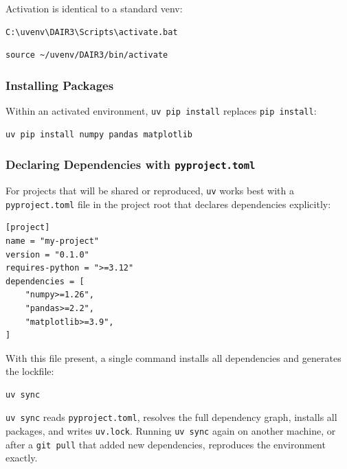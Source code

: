 Activation is identical to a standard venv:

\begin{lstlisting}[style=windowsStyle]
C:\uvenv\DAIR3\Scripts\activate.bat
\end{lstlisting}

\begin{lstlisting}[style=linuxStyle]
source ~/uvenv/DAIR3/bin/activate
\end{lstlisting}

\subsubsection{Installing Packages}

Within an activated environment, \texttt{uv pip install} replaces
\texttt{pip install}:

\begin{lstlisting}[style=inlineStyle, caption={Installing packages with uv}]
uv pip install numpy pandas matplotlib
\end{lstlisting}

\subsubsection{Declaring Dependencies with \texttt{pyproject.toml}}

For projects that will be shared or reproduced, \texttt{uv} works best
with a \texttt{pyproject.toml} file in the project root that declares
dependencies explicitly:

\begin{lstlisting}[style=inlineStyle, caption={Minimal \texttt{pyproject.toml}}]
[project]
name = "my-project"
version = "0.1.0"
requires-python = ">=3.12"
dependencies = [
    "numpy>=1.26",
    "pandas>=2.2",
    "matplotlib>=3.9",
]
\end{lstlisting}

With this file present, a single command installs all dependencies and
generates the lockfile:

\begin{lstlisting}[style=inlineStyle]
uv sync
\end{lstlisting}

\texttt{uv sync} reads \texttt{pyproject.toml}, resolves the full
dependency graph, installs all packages, and writes \texttt{uv.lock}.
Running \texttt{uv sync} again on another machine, or after a
\texttt{git pull} that added new dependencies, reproduces the
environment exactly.

